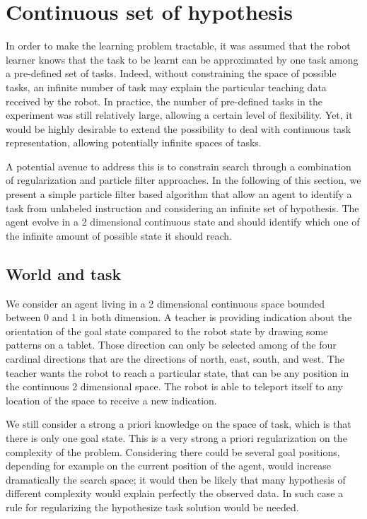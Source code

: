 
\section{Continuous set of hypothesis}
\label{chapter:limitations:continuoushypothesis}


In order to make the learning problem tractable, it was assumed that the robot learner knows that the task to be learnt can be approximated by one task among a pre-defined set of tasks. Indeed, without constraining the space of possible tasks, an infinite number of task may explain the particular teaching data received by the robot. In practice, the number of pre-defined tasks in the experiment was still relatively large, allowing a certain level of flexibility. Yet, it would be highly desirable to extend the possibility to deal with continuous task representation, allowing potentially infinite spaces of tasks. 

A potential avenue to address this is to constrain search through a combination of regularization and particle filter approaches. In the following of this section, we present a simple particle filter based algorithm that allow an agent to identify a task from unlabeled instruction and considering an infinite set of hypothesis. The agent evolve in a 2 dimensional continuous state and should identify which one of the infinite amount of possible state it should reach.

\subsection{World and task}

We consider an agent living in a 2 dimensional continuous space bounded between 0 and 1 in both dimension. A teacher is providing indication about the orientation of the goal state compared to the robot state by drawing some patterns on a tablet. Those direction can only be selected among of the four cardinal directions that are the directions of north, east, south, and west. The teacher wants the robot to reach a particular state, that can be any position in the continuous 2 dimensional space. The robot is able to teleport itself to any location of the space to receive a new indication.

We still consider a strong a priori knowledge on the space of task, which is that there is only one goal state. This is a very strong a priori regularization on the complexity of the problem. Considering there could be several goal positions, depending for example on the current position of the agent, would increase dramatically the search space; it would then be likely that many hypothesis of different complexity would explain perfectly the observed data. In such case a rule for regularizing the hypothesize task solution would be needed.

